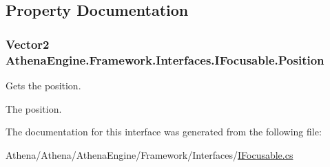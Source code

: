 \subsection{Property Documentation}
\hypertarget{interface_athena_engine_1_1_framework_1_1_interfaces_1_1_i_focusable_a9520d4dbfc7b7ace27aec2dfce79050b}{
\subsubsection[{Position}]{\setlength{\rightskip}{0pt plus 5cm}Vector2 Athena\-Engine.\-Framework.\-Interfaces.\-I\-Focusable.\-Position\hspace{0.3cm}{\ttfamily [get]}}}\label{interface_athena_engine_1_1_framework_1_1_interfaces_1_1_i_focusable_a9520d4dbfc7b7ace27aec2dfce79050b}


Gets the position. 

The position. 

The documentation for this interface was generated from the following file\-:\begin{DoxyCompactItemize}
\item 
Athena/\-Athena/\-Athena\-Engine/\-Framework/\-Interfaces/\hyperlink{_i_focusable_8cs}{I\-Focusable.\-cs}\end{DoxyCompactItemize}
